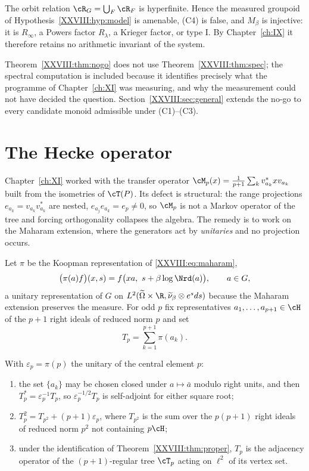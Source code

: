 \begin{theorem}[No-go for (C4)]\label{XXVIII:thm:nogo}
The orbit relation $\cR_G=\bigcup_F\cR_F$ is hyperfinite. Hence the measured groupoid of
Hypothesis~\ref{XXVIII:hyp:model} is amenable, (C4) is false, and $M_\beta$ is injective: it is
$R_\infty$, a Powers factor $R_\lambda$, a Krieger factor, or type I. By Chapter~\ref{ch:IX} it therefore
retains no arithmetic invariant of the system.
\end{theorem}

Theorem~\ref{XXVIII:thm:nogo} does not use Theorem~\ref{XXVIII:thm:spec}; the spectral computation is included
because it identifies precisely what the programme of Chapter~\ref{ch:XI} was measuring, and why the
measurement could not have decided the question. Section~\ref{XXVIII:sec:general} extends the no-go to
every candidate monoid admissible under (C1)--(C3).

\section{The Hecke operator}\label{XXVIII:sec:hecke}

Chapter~\ref{ch:XI} worked with the transfer operator $\cM_p(x)=\frac1{p+1}\sum_kv_{a_k}^*xv_{a_k}$ built
from the isometries of $\cT(P)$. Its defect is structural: the range projections
$e_{a_k}=v_{a_k}v_{a_k}^*$ are nested, $e_{a_j}e_{a_k}=e_p\ne0$, so $\cM_p$ is not a Markov
operator of the tree and forcing orthogonality collapses the algebra. The remedy is to work on the
Maharam extension, where the generators act by \emph{unitaries} and no projection occurs.

\begin{definition}\label{XXVIII:def:hecke}
Let $\pi$ be the Koopman representation of \eqref{XXVIII:eq:maharam},
\[
\bigl(\pi(a)f\bigr)(x,s)=f\bigl(xa,\ s+\beta\log\Nrd(a)\bigr),
\qquad a\in G,
\]
a unitary representation of $G$ on $L^2(\widetilde\Omega\times\R,\widetilde\nu_\beta\otimes e^sds)$
because the Maharam extension preserves the measure. For odd $p$ fix representatives
$a_1,\dots,a_{p+1}\in\cH$ of the $p+1$ right ideals of reduced norm $p$ and set
\[
T_p=\sum_{k=1}^{p+1}\pi(a_k).
\]
\end{definition}

\begin{lemma}\label{XXVIII:lem:hecke}
With $\varepsilon_p=\pi(p)$ the unitary of the central element $p$:
\begin{enumerate}
\item the set $\{a_k\}$ may be chosen closed under $a\mapsto\bar a$ modulo right units, and then
$T_p^*=\varepsilon_p^{-1}T_p$, so $\varepsilon_p^{-1/2}T_p$ is self-adjoint for either square root;
\item $T_p^2=T_{p^2}+(p+1)\varepsilon_p$, where $T_{p^2}$ is the sum over the $p(p+1)$ right
ideals of reduced norm $p^2$ not containing $p\cH$;
\item under the identification of Theorem~\ref{XXVIII:thm:proper}, $T_p$ is the adjacency operator of the
$(p+1)$-regular tree $\cT_p$ acting on $\ell^2$ of its vertex set.
\end{enumerate}
\end{lemma}

